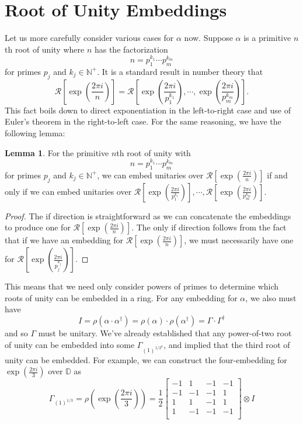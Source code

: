 \documentclass{article}
\theoremstyle{definition}
\theoremstyle{theorem}
\newtheorem{lemma}{Lemma}
\theoremstyle{remark}
\begin{document}
	\section{Root of Unity Embeddings}
	Let us more carefully consider various cases for $\alpha$ now. Suppose $\alpha$ is a primitive $n$th root of unity where $n$ has the factorization
	\[
		n = p_1^{k_1}\cdots p_m^{k_m}
	\]
	for primes $p_j$ and $k_j\in\mathbb{N}^+$. It is a standard result in number theory that
	\[
		\mathcal{R}\left[\exp\left(\frac{2\pi i}{n}\right)\right] = \mathcal{R}\left[\exp\left(\frac{2\pi i}{p_1^{k_1}}\right),\cdots,\exp\left(\frac{2\pi i}{p_m^{k_m}}\right)\right].
	\]
	This fact boils down to direct exponentiation in the left-to-right case and use of Euler's theorem in the right-to-left case. For the same reasoning, we have the following lemma:
	\begin{lemma}
		For the primitive $n$th root of unity with
		\[
			n = p_1^{k_1}\cdots p_m^{k_m}
		\]
		for primes $p_j$ and $k_j\in\mathbb{N}^+$, we can embed unitaries over $\mathcal{R}\left[\exp\left(\frac{2\pi i}{n}\right)\right]$ if and only if we can embed unitaries over $\mathcal{R}\left[\exp\left(\frac{2\pi i}{p_1^{k_1}}\right)\right],\cdots,\mathcal{R}\left[\exp\left(\frac{2\pi i}{p_m^{k_m}}\right)\right]$.
	\end{lemma}
	\begin{proof}
		The if direction is straightforward as we can concatenate the embeddings to produce one for $\mathcal{R}\left[\exp\left(\frac{2\pi i}{n}\right)\right]$. The only if direction follows from the fact that if we have an embedding for $\mathcal{R}\left[\exp\left(\frac{2\pi i}{n}\right)\right]$, we must necessarily have one for $\mathcal{R}\left[\exp\left(\frac{2\pi i}{p_j^{k_j}}\right)\right]$.
	\end{proof}
	This means that we need only consider powers of primes to determine which roots of unity can be embedded in a ring. For any embedding for $\alpha$, we also must have
	\[
	I = \rho(\alpha \cdot \alpha^\dagger) = \rho(\alpha)\cdot \rho(\alpha^\dagger) = \Gamma \cdot\Gamma^\dagger
	\]
	and so $\Gamma$ must be unitary. We've already established that any power-of-two root of unity can be embedded into some $\Gamma_{(1)^{1/2^k}}$, and implied that the third root of unity can be embedded. For example, we can construct the four-embedding for $\exp\left(\frac{2\pi i}{3}\right)$ over $\mathbb{D}$ as
	\[
		\Gamma_{(1)^{1/3}} = \rho\left(\exp\left(\frac{2\pi i}{3}\right)\right) = \frac{1}{2}\begin{bmatrix}
		-1 & 1 & -1 & -1  \\
		-1 & -1 & -1 & 1 \\
		1 & 1 & -1 & 1 \\
		1 & -1 & -1 & -1 \\
		\end{bmatrix}\otimes I
	\]
\end{document}
